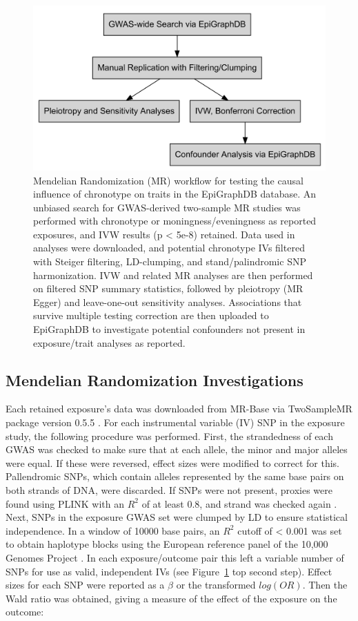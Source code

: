 \documentclass[journal,article,submit,moreauthors,pdftex]{Definitions/mdpi}
\begin{document}
\begin{figure}[htbp]
	\centering
	\includegraphics[width=0.9\linewidth]{Figs/Analysis1/outline.png}
	\caption{Mendelian Randomization (MR) workflow for testing the causal influence of chronotype on traits in the EpiGraphDB database. An unbiased search for GWAS-derived two-sample MR studies was performed with chronotype or moningness/eveningness as reported exposures, and IVW results (p < 5e-8) retained. Data used in analyses were downloaded, and potential chronotype IVs filtered with Steiger filtering, LD-clumping, and stand/palindromic SNP harmonization. IVW and related MR analyses are then performed on filtered SNP summary statistics, followed by pleiotropy (MR Egger) and leave-one-out sensitivity analyses. Associations that survive multiple testing correction are then uploaded to EpiGraphDB to investigate potential confounders not present in exposure/trait analyses as reported.}
	\label{fig:MR_Workflow}
\end{figure}

\subsection{Mendelian Randomization Investigations}

Each retained exposure's data was downloaded from MR-Base via TwoSampleMR package version 0.5.5 \cite{hemani_mr-base_2018}. For each instrumental variable (IV) SNP in the exposure study, the following procedure was performed. First, the strandedness of each GWAS was checked to make sure that at each allele, the minor and major alleles were equal. If these were reversed, effect sizes were modified to correct for this. Pallendromic SNPs, which contain alleles represented by the same base pairs on both strands of DNA, were discarded. If SNPs were not present, proxies were found using PLINK with an $R^2$ of at least 0.8, and strand was checked again \cite{plink}. Next, SNPs in the exposure GWAS set were clumped by LD to ensure statistical independence. In a window of 10000 base pairs, an $R^2$ cutoff of < 0.001 was set to obtain haplotype blocks using the European reference panel of the 10,000 Genomes Project \cite{10kgenomes}. In each exposure/outcome pair this left a variable number of SNPs for use as valid, independent IVs (see Figure~\ref{fig:MR_Workflow} top second step). Effect sizes for each SNP were reported as a $\beta$ or the transformed $log(OR)$. Then the Wald ratio was obtained, giving a measure of the effect of the exposure on the outcome: 
\end{document}
